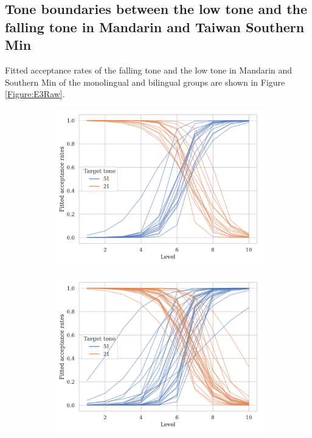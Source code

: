\documentclass[12pt]{report}
\begin{document}
\begin{CJK}{UTF8}{bsmi}
\section{Tone boundaries between the low tone and the falling tone in Mandarin and Taiwan Southern Min}

Fitted acceptance rates of the falling tone and the low tone in Mandarin and Southern Min of the monolingual and bilingual groups are shown in Figure \ref{Figure:E3Raw}.

\begin{figure}[hbt!]
\centering
\begin{subfigure}[b]{.45\textwidth}
\centering
\includegraphics[width=\textwidth]{Figures/E3/Mandarin_monolingual_E3_raw.png}
\end{subfigure}
\hfill
\begin{subfigure}[b]{.45\textwidth}
\centering
\includegraphics[width=\textwidth]{Figures/E3/Mandarin_bilingual_E3_raw.png}

\end{subfigure}
\end{figure}
\end{CJK}
\end{document}
